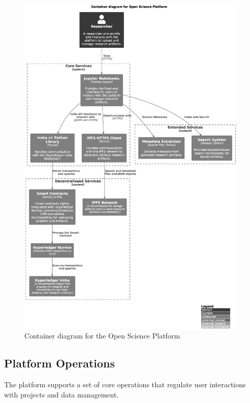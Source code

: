 \documentclass{article}
\begin{document}
\begin{figure}[htbp]
      \centering
      \includegraphics[width=0.98\textwidth, keepaspectratio]{c4_container_diagram.eps}
      \caption{Container diagram for the Open Science Platform}
      \label{fig:c4_container_diagram}
\end{figure}



\subsection{Platform Operations}
The platform supports a set of core operations that regulate user interactions with projects and data management.
\end{document}
